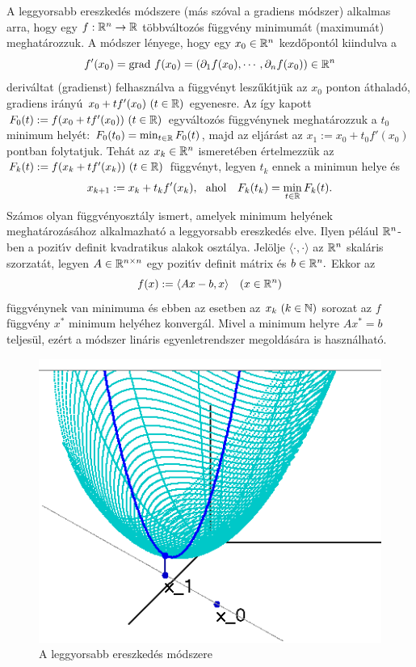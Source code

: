 \documentclass[oneside,titlepage,12pt,a4paper]{report}
\DeclareMathOperator{\grad}{grad}
\begin{document}
A leggyorsabb ereszked\'es  m\'odszere (m\'as sz\'oval a gradiens m\'odszer) alkalmas arra, hogy egy $f:\Bbb R^n\to\Bbb R$ t\"obbv\'altoz\'os  f\"uggv\'eny   minimum\'at (maximum\'at)
  meghat\'arozzuk. A m\'odszer l\'enyege, hogy egy $x_0\in\Bbb R^n$ kezd\H opont\'ol
kiindulva  a
\begin{equation*}
f'(x_0)=\grad\, f(x_0)=(\partial_1 f(x_0),\cdots,\partial_n f(x_0))\in\Bbb R^n
\end{equation*}
 deriv\'altat (gradienst) felhasználva a f\"uggv\'enyt lesz\H uk\'\i tj\"uk az $x_0$ ponton \'athalad\'o, gradiens ir\'any\'u $x_0+tf'(x_0)\ (t\in \Bbb R)$ egyenesre. Az így kapott
$ F_0(t):=f(x_0+tf'(x_0))\ (t\in\Bbb R)$ egyv\'altoz\'os f\"uggv\'enynek meghat\'arozzuk  a
$t_0$ minimum hely\'et: $F_0(t_0)=\min_{t\in\Bbb R}F_0(t)$, majd az elj\'ar\'ast az $x_1:=x_0+t_0f'(x_0)$ pontban folytatjuk.  Tehát az $x_k\in \Bbb R^n$ ismeret\'eben \'ertelmezz\"uk az $F_k(t):=f(x_k+tf'(x_k))\ (t\in\Bbb R)$  f\"uggv\'enyt,  legyen
 $t_k$ ennek a minimun helye \'es
\begin{equation*}
x_{k+1}:=x_k+t_kf'(x_k),\ \ \text{ahol}\ \ \ F_k(t_k)=\min_{t\in\Bbb R} F_k(t).
\end{equation*}
Sz\'amos olyan f\"uggv\'enyoszt\'aly ismert, amelyek minimum helyének meghatározásához alkalmazhat\'o a leggyorsabb ereszked\'es elve. Ilyen p\'el\'aul $\Bbb R^n$-ben a
pozit\'\i v definit kvadratikus alakok oszt\'alya. Jel\"olje $\langle\cdot,\cdot\rangle $
az $\Bbb R^n$ skal\'aris szorzat\'at, legyen  $A\in\Bbb R^{n\times n}$
egy pozit\'\i v definit m\'atrix \'es $b\in\Bbb R^n.$ Ekkor az
\begin{equation*}
 f(x):=\langle Ax-b, x\rangle \quad (x\in\Bbb R^n)
\end{equation*}
 f\"uggv\'enynek van minimuma \'es ebben az esetben az $x_k\ (k\in\Bbb N)$ sorozat az $f$ f\"uggv\'eny $x^\ast$ minimum hely\'ehez  konverg\'al. Mivel a minimum helyre $Ax^\ast=b$
 teljes\"ul, ez\'ert a m\'odszer lin\'aris egyenletrendszer megold\'as\'ara is haszn\'alhat\'o. 
\begin{figure}[htb!]
\begin{center}
   \includegraphics[scale=0.5]{./Abrak/Ereszkedo/Parabola.png}
  \caption{A leggyorsabb ereszked\'es m\'odszere}
\end{center}
\end{figure}
\end{document}
